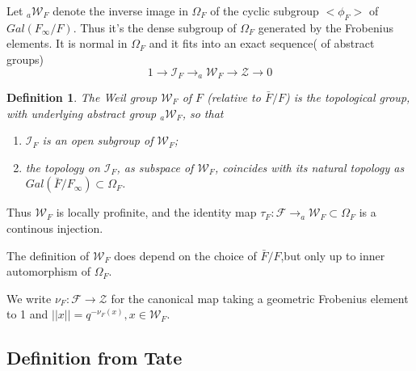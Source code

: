 \documentclass{article}
\theoremstyle{theorem}
\newtheorem{defe}{Definition}
\begin{document}
Let $_{a}{\mathcal{W}_{F}}$ denote the inverse image in $\Omega_{F}$ of the cyclic subgroup $<\phi_{F}>$ of $Gal(F_{\infty}/F)$. Thus it's the dense subgroup of $\Omega_{F}$ generated by the Frobenius elements. It is normal in $\Omega_{F}$ and it fits into an exact sequence( of abstract groups)
\begin{equation*}
    1\rightarrow \mathcal{I}_{F}\rightarrow _{a}\mathcal{W}_{F}\rightarrow\mathcal{Z}\rightarrow 0
\end{equation*}

\begin{defe}
The Weil group $\mathcal{W}_{F}$ of $F$ (relative to $\bar{F}/F$) is the topological group, with underlying abstract group $_{a}\mathcal{W}_{F}$, so that 
\begin{enumerate}
    \item $\mathcal{I}_{F}$ is an open subgroup of $\mathcal{W}_{F}$;
    \item the topology on $\mathcal{I}_{F}$, as subspace of $\mathcal{W}_{F}$, coincides with its natural topology as $Gal(\bar{F}/F_{\infty})\subset\Omega_{F}$.
\end{enumerate}
\end{defe}
Thus $\mathcal{W}_{F}$ is locally profinite, and the identity map $\tau_{F}:\mathcal{F}\rightarrow _{a}\mathcal{W}_{F}\subset\Omega_{F}$ is a continous injection.

The definition of $\mathcal{W}_{F}$ does depend on the choice of $\bar{F}/F$,but only up to inner automorphism of $\Omega_{F}$.

We write $\nu_{F}:\mathcal{F}\rightarrow\mathcal{Z}$ for the canonical map taking a geometric Frobenius element to 1 and $||x||=q^{-\nu_{F}(x)},x\in\mathcal{W}_{F}.$
\subsection{Definition from Tate}
\end{document}
